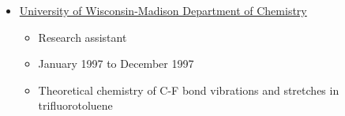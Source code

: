 \begin{itemize}
  
  
  \item \href{http://www.chem.wisc.edu}{University of Wisconsin-Madison Department of Chemistry}
  \begin{itemize}
    \item Research assistant
    \item January 1997 to December 1997
    \item Theoretical chemistry of C-F bond vibrations and stretches in trifluorotoluene
  \end{itemize}
  
\end{itemize}

